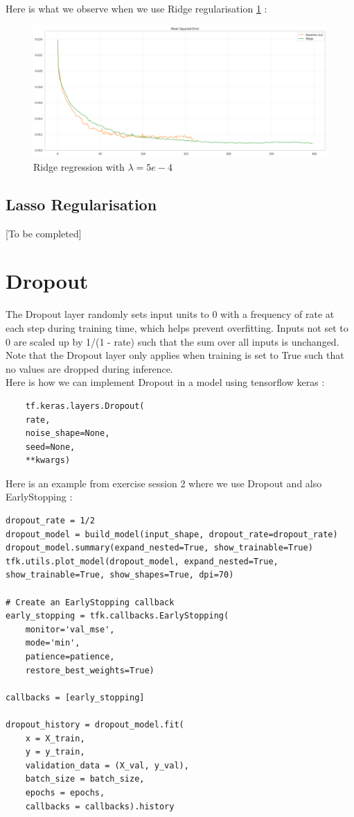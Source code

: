 \documentclass[a4paper,12pt]{article}
\begin{document}
Here is what we observe when we use Ridge regularisation \ref{fig:ridge_regression} :

\begin{figure}[h!]
    \centering
    \includegraphics[width=1\textwidth]{RidgeRegression.png}
    \caption{Ridge regression with $\lambda = 5e-4$}
    \label{fig:ridge_regression}
\end{figure}

\subsection{Lasso Regularisation}
[To be completed]

\section{Dropout}
The Dropout layer randomly sets input units to 0 with a frequency of rate at each step during training time, which helps prevent overfitting. Inputs not set to 0 are scaled up by 1/(1 - rate) such that the sum over all inputs is unchanged.\\

Note that the Dropout layer only applies when training is set to True such that no values are dropped during inference.\\

Here is how we can implement Dropout in a model using tensorflow keras :

\begin{verbatim}
    tf.keras.layers.Dropout(
    rate,
    noise_shape=None,
    seed=None,
    **kwargs)
\end{verbatim}

Here is an example from exercise session 2 where we use Dropout and also EarlyStopping :

\begin{verbatim}
dropout_rate = 1/2
dropout_model = build_model(input_shape, dropout_rate=dropout_rate)
dropout_model.summary(expand_nested=True, show_trainable=True)
tfk.utils.plot_model(dropout_model, expand_nested=True, show_trainable=True, show_shapes=True, dpi=70)

# Create an EarlyStopping callback
early_stopping = tfk.callbacks.EarlyStopping(
    monitor='val_mse',
    mode='min',
    patience=patience,
    restore_best_weights=True)

callbacks = [early_stopping]

dropout_history = dropout_model.fit(
    x = X_train,
    y = y_train,
    validation_data = (X_val, y_val),
    batch_size = batch_size,
    epochs = epochs,
    callbacks = callbacks).history
\end{verbatim}
\end{document}

